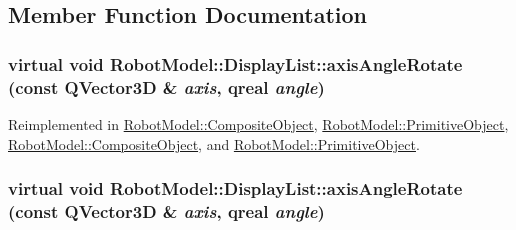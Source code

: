 \subsection{Member Function Documentation}
\hypertarget{class_robot_model_1_1_display_list_a9a7084168997ac285ee1e9f4041a8d57}{
\subsubsection[{axisAngleRotate}]{\setlength{\rightskip}{0pt plus 5cm}virtual void RobotModel::DisplayList::axisAngleRotate (const QVector3D \& {\em axis}, \/  qreal {\em angle})}}
\label{class_robot_model_1_1_display_list_a9a7084168997ac285ee1e9f4041a8d57}


Reimplemented in \hyperlink{class_robot_model_1_1_composite_object_a357f5ed3f49e0889df511271e468f866}{RobotModel::CompositeObject}, \hyperlink{class_robot_model_1_1_primitive_object_a97b449302680b96410ff7296c794f640}{RobotModel::PrimitiveObject}, \hyperlink{class_robot_model_1_1_composite_object_aa59e7af66ca1a0ced127d8f2b30c7a6d}{RobotModel::CompositeObject}, and \hyperlink{class_robot_model_1_1_primitive_object_ae57db819937782138821a30960a72aa0}{RobotModel::PrimitiveObject}.\hypertarget{class_robot_model_1_1_display_list_a9a7084168997ac285ee1e9f4041a8d57}{
\subsubsection[{axisAngleRotate}]{\setlength{\rightskip}{0pt plus 5cm}virtual void RobotModel::DisplayList::axisAngleRotate (const QVector3D \& {\em axis}, \/  qreal {\em angle})}}
\label{class_robot_model_1_1_display_list_a9a7084168997ac285ee1e9f4041a8d57}


